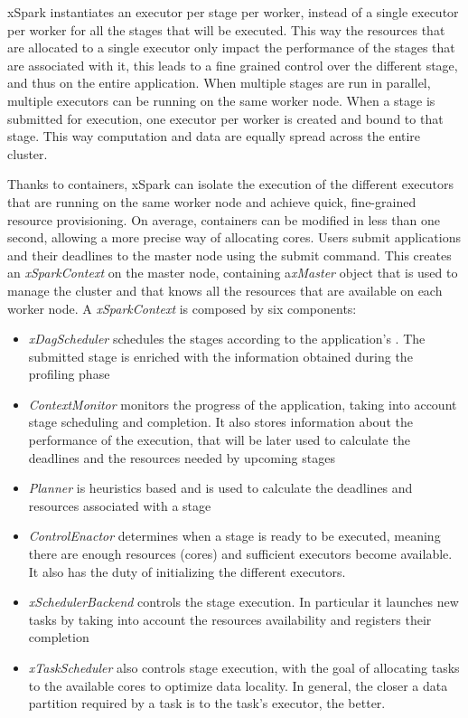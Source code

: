 xSpark instantiates an executor per stage per worker, instead of a single executor per worker for all the stages that will be executed. This way the resources that are allocated to a single executor only impact the performance of the stages that are associated with it, this leads to a fine grained control over the different stage, and thus on the entire application. When 
multiple stages are run in parallel, multiple executors can be running on the same worker node. When a stage is submitted for execution, one executor per worker is created and bound to that stage. This way computation and data are equally spread across the entire cluster.

Thanks to containers, xSpark can isolate the execution of the different executors that are running on the same worker node and achieve quick, fine-grained resource provisioning. On average, containers can be modified in less than one second, allowing a more precise way of
allocating cores.
Users submit applications and their deadlines to the master node using the submit command. This creates an \textit{xSparkContext} on the master node, containing a\textit{xMaster} object that is used to manage the cluster and that knows all the resources that are available on each worker
node. A \textit{xSparkContext} is composed by six components:
\begin{itemize}
	\item\textit{xDagScheduler} schedules the stages according to the application’s \plan. The submitted stage is enriched with the information obtained during the profiling phase
	\item\textit{ContextMonitor} monitors the progress of the application, taking into account stage scheduling and completion. It also stores information about the performance of the execution, that will be later used to calculate the deadlines and the resources needed by upcoming stages
	\item\textit{Planner} is heuristics based and is used to calculate the deadlines and resources associated with a stage
	\item\textit{ControlEnactor} determines when a stage is ready to be executed, meaning there are enough resources (cores) and sufficient executors become available. It also has the duty of initializing the different executors.
	\item\textit{xSchedulerBackend} controls the stage execution. In particular it launches new tasks by taking into account the resources availability and registers their completion
	\item\textit{xTaskScheduler} also controls stage execution, with the goal of allocating tasks to the available cores to optimize data locality. 
	In general, the closer a data partition required by a task is to the task’s executor, the better.
\end{itemize}


